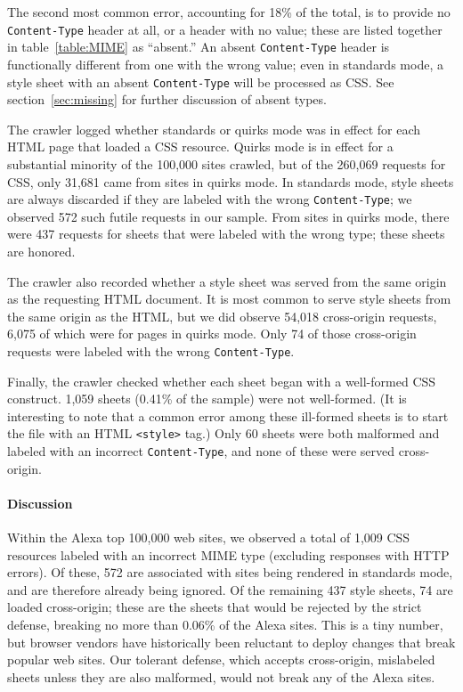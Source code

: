 \documentclass{acm_proc_article-sp}
\begin{document}
The second most common error, accounting for 18\% of the total, is to
provide no \verb|Content-Type| header at all, or a header with no
value; these are listed together in table~\ref{table:MIME} as
“absent.”  An absent \verb|Content-Type| header is functionally
different from one with the wrong value; even in standards mode, a
style sheet with an absent \verb|Content-Type| will be processed as
CSS.  See section~\ref{sec:missing} for further discussion of absent
types.

The crawler logged whether standards or quirks mode was in effect for
each HTML page that loaded a CSS resource.  Quirks mode is in effect
for a substantial minority of the 100,000 sites crawled, but of the
260,069 requests for CSS, only 31,681 came from sites in quirks mode.
In standards mode, style sheets are always discarded if they are
labeled with the wrong \verb|Content-Type|; we observed 572 such
futile requests in our sample.  From sites in quirks mode, there were
437 requests for sheets that were labeled with the wrong type; these
sheets are honored.

The crawler also recorded whether a style sheet was served from the
same origin as the requesting HTML document.  
It is most common to serve style sheets from the same origin as the
HTML, but we did observe 54,018 cross-origin requests, 6,075 of which
were for pages in quirks mode.  Only 74 of those cross-origin requests
were labeled with the wrong \verb|Content-Type|.

Finally, the crawler checked whether each sheet began with a
well-formed CSS construct.  1,059 sheets (0.41\% of the sample) were
not well-formed.  (It is interesting to note that a common error among
these ill-formed sheets is to start the file with an HTML
\verb|<style>| tag.)  Only 60 sheets were both malformed and labeled
with an incorrect \verb|Content-Type|, and none of these were served
cross-origin.

\paragraph{Discussion}
Within the Alexa top 100,000 web sites, we observed a total of 1,009
CSS resources labeled with an incorrect MIME type (excluding responses
with HTTP errors).  Of these, 572 are associated with sites being
rendered in standards mode, and are therefore already being ignored.
Of the remaining 437 style sheets, 74 are loaded cross-origin; these
are the sheets that would be rejected by the strict defense, breaking
no more than 0.06\% of the Alexa sites.  
This is a tiny number, but browser vendors have historically been
reluctant to deploy changes that break popular web sites.  Our
tolerant defense, which accepts cross-origin, mislabeled sheets unless
they are also malformed, would not break any of the Alexa sites.
\end{document}
